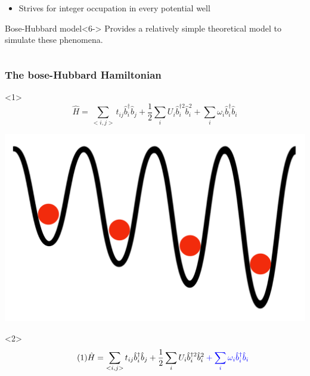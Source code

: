 \documentclass[aspectratio=169]{beamer}
\begin{document}
\begin{frame}
\begin{onlyenv}
\begin{columns}[T]
\begin{column}{.48\textwidth}
\begin{itemize}
          \item<5-> Strives for integer occupation in every potential well
        \end{itemize}
        \begin{alertblock}{Bose-Hubbard model}<6->
          Provides a relatively simple theoretical model to simulate these phenomena.
        \end{alertblock}
      \end{column}%
    \end{columns}
  \end{onlyenv}
\end{frame}

\begin{frame}
\frametitle{The bose-Hubbard Hamiltonian}
\begin{onlyenv}<1>
  \begin{equation}
    \hat{H} = \sum_{<i,j>} t_{ij}\hat{b}_i^\dagger \hat{b}_j + \frac{1}{2}\sum_i U_i\hat{b}_i^{\dagger 2} \hat{b}_i^{2} + \sum_i \omega_i \hat{b}_i^\dagger \hat{b}_i
  \end{equation}
  \begin{center}
    \includegraphics[scale=0.1]{../img/H.png}
  \end{center}
\end{onlyenv}
\begin{onlyenv}<2>
  \begin{equation}\tag{1}
    \hat{H} = \sum_{<i,j>} t_{ij}\hat{b}_i^\dagger \hat{b}_j + \frac{1}{2}\sum_i U_i\hat{b}_i^{\dagger 2} \hat{b}_i^{2} \color{blue}+ \sum_i \omega_i \hat{b}_i^\dagger \hat{b}_i
  \end{equation}
  \begin{center}

\end{center}
\end{onlyenv}
\end{frame}
\end{document}
